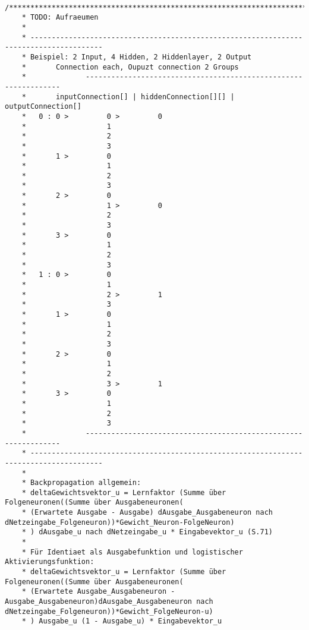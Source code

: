 \begin{lstlisting}
	/****************************************************************************************
	* TODO: Aufraeumen
	*	
	* ---------------------------------------------------------------------------------------
	* Beispiel:	2 Input, 4 Hidden, 2 Hiddenlayer, 2 Output
	*		Connection each, Oupuzt connection 2 Groups
	*              ----------------------------------------------------------------
	*		inputConnection[] | hiddenConnection[][] | outputConnection[]
	*	0 :	0 >			0 >			0
	*					1
	*					2
	*					3
	*		1 >			0
	*					1
	*					2
	*					3
	*		2 >			0
	*					1 >			0
	*					2
	*					3
	*		3 >			0
	*					1
	*					2
	*					3
	*	1 :	0 >			0
	*					1
	*					2 >			1
	*					3
	*		1 >			0
	*					1
	*					2
	*					3
	*		2 >			0
	*					1
	*					2
	*					3 >			1
	*		3 >			0
	*					1
	*					2
	*					3
	*              ----------------------------------------------------------------
	* ---------------------------------------------------------------------------------------
	*
	* Backpropagation allgemein:
	* deltaGewichtsvektor_u = Lernfaktor (Summe über Folgeneuronen((Summe über Ausgabeneuronen(
	* (Erwartete Ausgabe - Ausgabe) dAusgabe_Ausgabeneuron nach dNetzeingabe_Folgeneuron))*Gewicht_Neuron-FolgeNeuron)
	* ) dAusgabe_u nach dNetzeingabe_u * Eingabevektor_u (S.71)
	*
	* Für Identiaet als Ausgabefunktion und logistischer Aktivierungsfunktion:
	* deltaGewichtsvektor_u = Lernfaktor (Summe über Folgeneuronen((Summe über Ausgabeneuronen(
	* (Erwartete Ausgabe_Ausgabeneuron - Ausgabe_Ausgabeneuron)dAusgabe_Ausgabeneuron nach dNetzeingabe_Folgeneuron))*Gewicht_FolgeNeuron-u)
	* ) Ausgabe_u (1 - Ausgabe_u) * Eingabevektor_u
	

\end{lstlisting}
